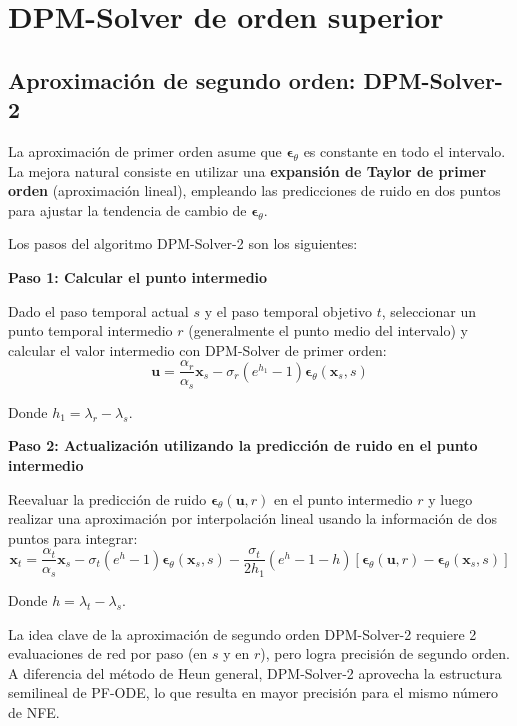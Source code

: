 \section{DPM-Solver de orden superior}

\subsection{Aproximación de segundo orden: DPM-Solver-2}

La aproximación de primer orden asume que $\boldsymbol{\epsilon}_\theta$ es constante en todo el intervalo. La mejora natural consiste en utilizar una \textbf{expansión de Taylor de primer orden} (aproximación lineal), empleando las predicciones de ruido en dos puntos para ajustar la tendencia de cambio de $\boldsymbol{\epsilon}_\theta$.

Los pasos del algoritmo DPM-Solver-2 son los siguientes:

\textbf{Paso 1: Calcular el punto intermedio}

Dado el paso temporal actual $s$ y el paso temporal objetivo $t$, seleccionar un punto temporal intermedio $r$ (generalmente el punto medio del intervalo) y calcular el valor intermedio con DPM-Solver de primer orden:
$$\mathbf{u} = \frac{\alpha_r}{\alpha_s} \mathbf{x}_s - \sigma_r (e^{h_1} - 1) \boldsymbol{\epsilon}_\theta(\mathbf{x}_s, s)$$

Donde $h_1 = \lambda_r - \lambda_s$.

\textbf{Paso 2: Actualización utilizando la predicción de ruido en el punto intermedio}

Reevaluar la predicción de ruido $\boldsymbol{\epsilon}_\theta(\mathbf{u}, r)$ en el punto intermedio $r$ y luego realizar una aproximación por interpolación lineal usando la información de dos puntos para integrar:
$$\mathbf{x}_t = \frac{\alpha_t}{\alpha_s} \mathbf{x}_s - \sigma_t (e^{h} - 1) \boldsymbol{\epsilon}_\theta(\mathbf{x}_s, s) - \frac{\sigma_t}{2h_1}(e^{h} - 1 - h)\left[\boldsymbol{\epsilon}_\theta(\mathbf{u}, r) - \boldsymbol{\epsilon}_\theta(\mathbf{x}_s, s)\right]$$

Donde $h = \lambda_t - \lambda_s$.

\begin{importantbox}{La idea clave de la aproximación de segundo orden}
DPM-Solver-2 requiere 2 evaluaciones de red por paso (en $s$ y en $r$), pero logra precisión de segundo orden. A diferencia del método de Heun general, DPM-Solver-2 aprovecha la estructura semilineal de PF-ODE, lo que resulta en mayor precisión para el mismo número de NFE.
\end{importantbox}

